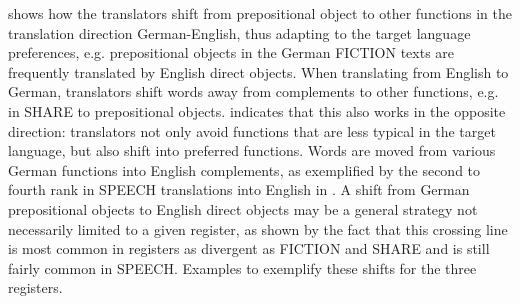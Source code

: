 \documentclass[output=paper]{LSP/langsci}
\begin{document}
\begin{table}
\caption{The ten most frequent crossing lines per register and translation direction}
\label{tab:culo:4}
\end{table}


 shows how the translators shift from prepositional object to other functions in the translation direction German-English, thus adapting to the target language preferences, e.g. prepositional objects in the German FICTION texts are frequently translated by English direct objects. When translating from English to German, translators shift words away from complements to other functions, e.g. in SHARE to prepositional objects.  indicates that this also works in the opposite direction: translators not only avoid functions that are less typical in the target language, but also shift into preferred functions. Words are moved from various German functions into English complements, as exemplified by the second to fourth rank in SPEECH translations into English in . A shift from German prepositional objects to English direct objects may be a general strategy not necessarily limited to a given register, as shown by the fact that this crossing line is most common in registers as divergent as FICTION and SHARE and is still fairly common in SPEECH. Examples  to  exemplify these shifts for the three registers.
\end{document}
